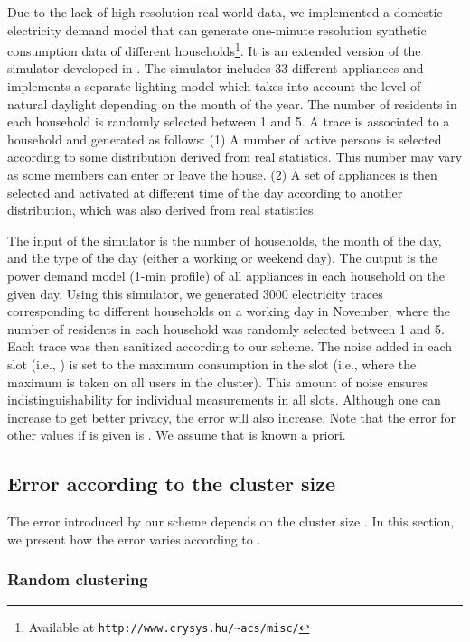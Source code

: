 \documentclass[11pt,a4paper]{article}
\theoremstyle{plain}
\theoremstyle{plain}
\theoremstyle{plain}
\theoremstyle{plain}
\theoremstyle{nonumberplain} \theoremseparator{}
\begin{document}
Due to the lack of high-resolution real world data, we implemented a domestic electricity demand model \cite{richardson10} that can generate one-minute resolution synthetic consumption data of different households\footnote{Available at \texttt{http://www.crysys.hu/\textasciitilde acs/misc/}}. It is an extended version of the simulator developed in \cite{richardson10}.  
The simulator includes 33 different appliances and implements a separate lighting model which takes into account the level of natural daylight depending on the month of the year. The number of residents in each household is randomly selected between 1 and 5. A trace is associated to a household and generated as follows: 
(1) A number of active persons is selected according to some distribution derived from real statistics. This number may vary as some members
can enter or leave the house. (2) A set of appliances is then selected and activated at different time of the day according to  another distribution,
which was also derived from real statistics. 
 
The input of the simulator is the number of households, the month of the day, and the type of the day (either a working or weekend day). The output is the power demand model (1-min profile) of all appliances in each household on the given day. Using this simulator, we generated 3000 electricity traces corresponding to different households on a working day in November, where the number of residents in each 
household was randomly selected between 1 and 5. Each trace was then sanitized according to our scheme.
The noise added in each slot (i.e., ) is set to the maximum consumption in the slot (i.e.,  where the maximum is taken on all users in the cluster). This amount of noise ensures  indistinguishability for individual measurements in all slots.
Although one can increase  to get better privacy, the error will also increase. Note that the error  for other  values if  is given is . We assume that  is known a priori.    


\subsection{Error according to the cluster size}  
    
The error introduced by our scheme depends on the cluster size . In this section, we present how the error varies according to .  

\subsubsection{Random clustering}
\end{document}
